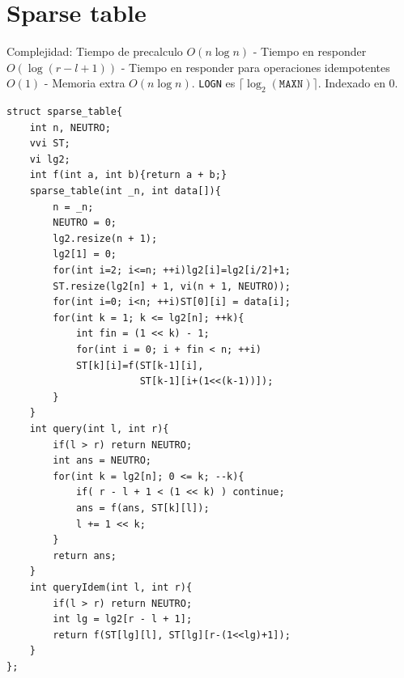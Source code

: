 \section{Sparse table}
Complejidad: Tiempo de precalculo $O(n\log n)$ - Tiempo en responder $O(\log (r - l + 1))$ - Tiempo en responder para operaciones idempotentes $O(1)$ - Memoria extra $O(n\log n)$. \texttt{LOGN} es $\lceil \log_2(\mathtt{MAXN}) \rceil$. Indexado en $0$.
\begin{verbatim}
struct sparse_table{
    int n, NEUTRO;
    vvi ST;
    vi lg2;
    int f(int a, int b){return a + b;}
    sparse_table(int _n, int data[]){
        n = _n;
        NEUTRO = 0;
        lg2.resize(n + 1);
        lg2[1] = 0;
        for(int i=2; i<=n; ++i)lg2[i]=lg2[i/2]+1;
        ST.resize(lg2[n] + 1, vi(n + 1, NEUTRO));
        for(int i=0; i<n; ++i)ST[0][i] = data[i];
        for(int k = 1; k <= lg2[n]; ++k){
            int fin = (1 << k) - 1;
            for(int i = 0; i + fin < n; ++i)
            ST[k][i]=f(ST[k-1][i],
                       ST[k-1][i+(1<<(k-1))]);
        }
    }
    int query(int l, int r){
        if(l > r) return NEUTRO;
        int ans = NEUTRO;
        for(int k = lg2[n]; 0 <= k; --k){
            if( r - l + 1 < (1 << k) ) continue;
            ans = f(ans, ST[k][l]);
            l += 1 << k;
        }
        return ans;
    }
    int queryIdem(int l, int r){
        if(l > r) return NEUTRO;
        int lg = lg2[r - l + 1];
        return f(ST[lg][l], ST[lg][r-(1<<lg)+1]);
    }
};
\end{verbatim}